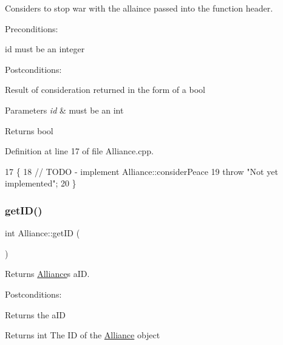 Considers to stop war with the allaince passed into the function header. 

Preconditions\+:
\begin{DoxyItemize}
\item id must be an integer
\end{DoxyItemize}

Postconditions\+:
\begin{DoxyItemize}
\item Result of consideration returned in the form of a bool
\end{DoxyItemize}


\begin{DoxyParams}{Parameters}
{\em id} & must be an int \\
\hline
\end{DoxyParams}
\begin{DoxyReturn}{Returns}
bool 
\end{DoxyReturn}


Definition at line 17 of file Alliance.\+cpp.


\begin{DoxyCode}
17                                    \{
18     \textcolor{comment}{// TODO - implement Alliance::considerPeace}
19     \textcolor{keywordflow}{throw} \textcolor{stringliteral}{"Not yet implemented"};
20 \}
\end{DoxyCode}
\mbox{\label{classAlliance_a7f23330454f02b0056eb92bd2072359d}} 
\subsubsection{\texorpdfstring{get\+I\+D()}{getID()}}
{\footnotesize\ttfamily int Alliance\+::get\+ID (\begin{DoxyParamCaption}{ }\end{DoxyParamCaption})}



Returns \hyperlink{classAlliance}{Alliance}\textquotesingle{}s a\+ID. 

Postconditions\+:
\begin{DoxyItemize}
\item Returns the a\+ID
\end{DoxyItemize}

\begin{DoxyReturn}{Returns}
int The ID of the \hyperlink{classAlliance}{Alliance} object 
\end{DoxyReturn}


